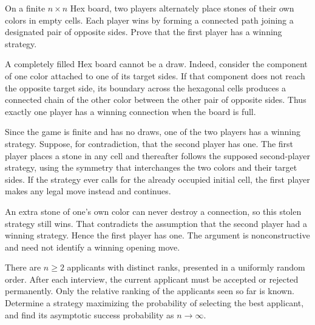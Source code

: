     \begin{expectedproblem}[Hex]
        On a finite $n\times n$ Hex board, two players alternately place stones
        of their own colors in empty cells. Each player wins by forming a
        connected path joining a designated pair of opposite sides. Prove that
        the first player has a winning strategy.
    \end{expectedproblem}

    \begin{solution}
        A completely filled Hex board cannot be a draw. Indeed, consider the
        component of one color attached to one of its target sides. If that
        component does not reach the opposite target side, its boundary across
        the hexagonal cells produces a connected chain of the other color
        between the other pair of opposite sides. Thus exactly one player has a
        winning connection when the board is full.

        Since the game is finite and has no draws, one of the two players has a
        winning strategy. Suppose, for contradiction, that the second player
        has one. The first player places a stone in any cell and thereafter
        follows the supposed second-player strategy, using the symmetry that
        interchanges the two colors and their target sides. If the strategy ever
        calls for the already occupied initial cell, the first player makes any
        legal move instead and continues.

        An extra stone of one's own color can never destroy a connection, so
        this stolen strategy still wins. That contradicts the assumption that
        the second player had a winning strategy. Hence the first player has
        one. The argument is nonconstructive and need not identify a winning
        opening move.
    \end{solution}

    \begin{expectedproblem}
        There are $n\geq2$ applicants with distinct ranks, presented in a
        uniformly random order. After each interview, the current applicant must be
        accepted or rejected permanently. Only the relative ranking of the
        applicants seen so far is known. Determine a strategy maximizing the
        probability of selecting the best applicant, and find its asymptotic
        success probability as $n\to\infty$.
    \end{expectedproblem}

